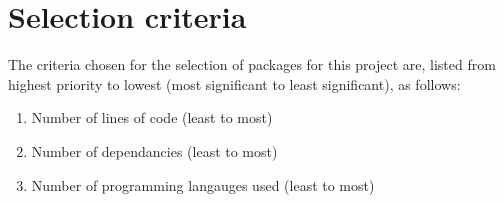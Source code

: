 \section{Selection criteria}\label{Selection criteria}

The criteria chosen for the selection of packages for this project are, listed from highest priority to lowest (most significant to least significant), as follows:

\begin{enumerate}
    \item Number of lines of code (least to most)
    \item Number of dependancies (least to most)
    \item Number of programming langauges used (least to most)
\end{enumerate}
